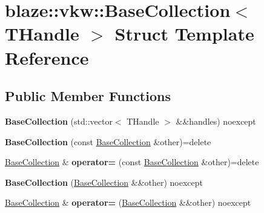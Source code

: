 \hypertarget{structblaze_1_1vkw_1_1BaseCollection}{}\section{blaze\+:\+:vkw\+:\+:Base\+Collection$<$ T\+Handle $>$ Struct Template Reference}
\label{structblaze_1_1vkw_1_1BaseCollection}
\subsection*{Public Member Functions}
\begin{DoxyCompactItemize}
\item 
\mbox{\label{structblaze_1_1vkw_1_1BaseCollection_aa4b0387bd4211363ca1a14fbd51bf680}} 
{\bfseries Base\+Collection} (std\+::vector$<$ T\+Handle $>$ \&\&handles) noexcept
\item 
\mbox{\label{structblaze_1_1vkw_1_1BaseCollection_a9ac6c0fd571c348f5a85b2de6db8eead}} 
{\bfseries Base\+Collection} (const \hyperlink{structblaze_1_1vkw_1_1BaseCollection}{Base\+Collection} \&other)=delete
\item 
\mbox{\label{structblaze_1_1vkw_1_1BaseCollection_a9b792d1bc3df6673e27b1c006427dbf1}} 
\hyperlink{structblaze_1_1vkw_1_1BaseCollection}{Base\+Collection} \& {\bfseries operator=} (const \hyperlink{structblaze_1_1vkw_1_1BaseCollection}{Base\+Collection} \&other)=delete
\item 
\mbox{\label{structblaze_1_1vkw_1_1BaseCollection_a9ca0db2bed5ddf71ea5d9c630579f569}} 
{\bfseries Base\+Collection} (\hyperlink{structblaze_1_1vkw_1_1BaseCollection}{Base\+Collection} \&\&other) noexcept
\item 
\mbox{\label{structblaze_1_1vkw_1_1BaseCollection_a4dfcd5fc166eec5ce5a94d90ae77b133}} 
\hyperlink{structblaze_1_1vkw_1_1BaseCollection}{Base\+Collection} \& {\bfseries operator=} (\hyperlink{structblaze_1_1vkw_1_1BaseCollection}{Base\+Collection} \&\&other) noexcept
\item 
\mbox{\label{structblaze_1_1vkw_1_1BaseCollection_a4d7e4b384dd9ff16b7d97fd525d9d663}} 

\end{DoxyCompactItemize}
